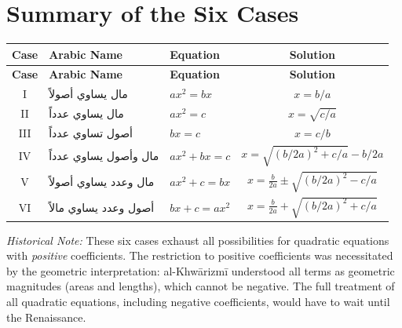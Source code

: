 \documentclass[11pt,a4paper,openany,oneside]{book}
\newcommand{\cnote}[1]{\textcolor{notecolor}{\textit{#1}}}
\newcommand{\ar}[1]{{\arabicfont\beginR #1\endR}}
\begin{document}
\newpage

\appendix
\chapter{Summary of the Six Cases}
\label{app:six-cases}

\begin{center}
\renewcommand{\arraystretch}{1.6}
\begin{longtable}{|c|l|l|c|}
\hline
\textbf{Case} & \textbf{Arabic Name} & \textbf{Equation} & \textbf{Solution} \\
\hline
\endfirsthead
\hline
\textbf{Case} & \textbf{Arabic Name} & \textbf{Equation} & \textbf{Solution} \\
\hline
\endhead
\hline
\endfoot
I & \ar{مال يساوي أصولاً} & $ax^2 = bx$ & $x = b/a$ \\
\hline
II & \ar{مال يساوي عدداً} & $ax^2 = c$ & $x = \sqrt{c/a}$ \\
\hline
III & \ar{أصول تساوي عدداً} & $bx = c$ & $x = c/b$ \\
\hline
IV & \ar{مال وأصول يساوي عدداً} & $ax^2 + bx = c$ & $x = \sqrt{(b/2a)^2 + c/a} - b/2a$ \\
\hline
V & \ar{مال وعدد يساوي أصولاً} & $ax^2 + c = bx$ & $x = \frac{b}{2a} \pm \sqrt{(b/2a)^2 - c/a}$ \\
\hline
VI & \ar{أصول وعدد يساوي مالاً} & $bx + c = ax^2$ & $x = \frac{b}{2a} + \sqrt{(b/2a)^2 + c/a}$ \\
\hline
\end{longtable}
\end{center}

\vspace{0.5cm}

\cnote{Historical Note:} These six cases exhaust all possibilities for quadratic equations with \textit{positive} coefficients. The restriction to positive coefficients was necessitated by the geometric interpretation: al-Khw\=arizm\={i} understood all terms as geometric magnitudes (areas and lengths), which cannot be negative. The full treatment of all quadratic equations, including negative coefficients, would have to wait until the Renaissance.

\newpage

\end{document}
